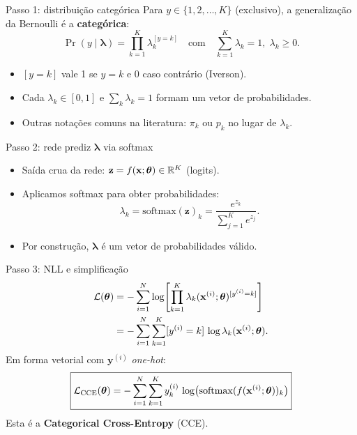 \documentclass[aspectratio=169,xcolor=dvipsnames]{beamer}
\begin{document}

  \begin{frame}{Passo 1: distribuição categórica}
    Para $y\in\{1,2,\ldots,K\}$ (exclusivo), a generalização da Bernoulli é a
    \textbf{categórica}:
    \[
      \Pr(y\mid \bm{\lambda}) = \prod_{k=1}^{K}\lambda_{k}^{[y=k]}
        \quad\text{com}\quad
        \sum_{k=1}^{K}\lambda_{k} = 1,\;\lambda_{k}\ge 0.
    \]
    \begin{itemize}
      \item $[y=k]$ vale 1 se $y=k$ e 0 caso contrário (Iverson).
      \item Cada $\lambda_k\in[0,1]$ e $\sum_k \lambda_k = 1$ formam um vetor de probabilidades.
      \item Outras notações comuns na literatura: $\pi_k$ ou $p_k$ no lugar de $\lambda_k$.
    \end{itemize}
  \end{frame}

  \begin{frame}{Passo 2: rede prediz $\bm{\lambda}$ via softmax}
    \begin{itemize}
      \item Saída crua da rede: $\mathbf{z} = f(\mathbf{x};\bm{\theta})\in\mathbb{R}^{K}$ (logits).
      \item Aplicamos softmax para obter probabilidades:
        \[
          \lambda_{k} = \mathrm{softmax}(\mathbf{z})_k = \frac{e^{z_k}}{\sum_{j=1}^{K}e^{z_j}}.
        \]
      \item Por construção, $\bm{\lambda}$ é um vetor de probabilidades válido.
    \end{itemize}
  \end{frame}

  \begin{frame}{Passo 3: NLL e simplificação}
    \begin{align*}
      \mathcal{L}(\bm{\theta})
        &= -\sum_{i=1}^{N}\log\!\left[\prod_{k=1}^{K}\lambda_{k}(\mathbf{x}^{(i)};\bm{\theta})^{[y^{(i)}=k]}\right] \\
        &= -\sum_{i=1}^{N}\sum_{k=1}^{K} [y^{(i)}=k]\,\log\lambda_{k}(\mathbf{x}^{(i)};\bm{\theta}).
    \end{align*}
    Em forma vetorial com $\mathbf{y}^{(i)}$ \textit{one-hot}:
    \[
      \boxed{\mathcal{L}_{\text{CCE}}(\bm{\theta}) = -\sum_{i=1}^{N}\sum_{k=1}^{K} y^{(i)}_{k}\,
        \log\!\big(\mathrm{softmax}(f(\mathbf{x}^{(i)};\bm{\theta}))_k\big)}
    \]
    Esta é a \textbf{Categorical Cross-Entropy} (CCE).
  \end{frame}
\end{document}
